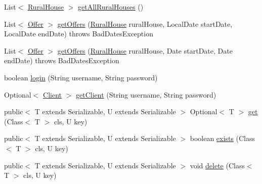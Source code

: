 \begin{DoxyCompactItemize}
List$<$ \mbox{\hyperlink{classcom_1_1ruralhousejsf_1_1domain_1_1_rural_house}{Rural\+House}} $>$ \mbox{\hyperlink{interfacecom_1_1ruralhousejsf_1_1business_logic_1_1_application_facade_interface_aba85657d1479d51b7bf1bd17d66d0513}{get\+All\+Rural\+Houses}} ()
\item 
List$<$ \mbox{\hyperlink{classcom_1_1ruralhousejsf_1_1domain_1_1_offer}{Offer}} $>$ \mbox{\hyperlink{interfacecom_1_1ruralhousejsf_1_1business_logic_1_1_application_facade_interface_a31b31b351fd53d7eabe3346b043dc744}{get\+Offers}} (\mbox{\hyperlink{classcom_1_1ruralhousejsf_1_1domain_1_1_rural_house}{Rural\+House}} rural\+House, Local\+Date start\+Date, Local\+Date end\+Date)  throws Bad\+Dates\+Exception
\item 
List$<$ \mbox{\hyperlink{classcom_1_1ruralhousejsf_1_1domain_1_1_offer}{Offer}} $>$ \mbox{\hyperlink{interfacecom_1_1ruralhousejsf_1_1business_logic_1_1_application_facade_interface_a1ce3b82ceb8bda252ff3a54bab3e1c69}{get\+Offers}} (\mbox{\hyperlink{classcom_1_1ruralhousejsf_1_1domain_1_1_rural_house}{Rural\+House}} rural\+House, Date start\+Date, Date end\+Date)  throws Bad\+Dates\+Exception
\item 
boolean \mbox{\hyperlink{interfacecom_1_1ruralhousejsf_1_1business_logic_1_1_application_facade_interface_a75cc2d20f7df7b8872333cca281bf343}{login}} (String username, String password)
\item 
Optional$<$ \mbox{\hyperlink{classcom_1_1ruralhousejsf_1_1domain_1_1_client}{Client}} $>$ \mbox{\hyperlink{interfacecom_1_1ruralhousejsf_1_1business_logic_1_1_application_facade_interface_af9901ddc9cbe77aaa08085c3c19167c6}{get\+Client}} (String username, String password)
\item 
public$<$ T extends Serializable, U extends Serializable $>$ Optional$<$ T $>$ \mbox{\hyperlink{interfacecom_1_1ruralhousejsf_1_1business_logic_1_1_application_facade_interface_ab34954db52378fc9370d4da9a09100c4}{get}} (Class$<$ T $>$ cls, U key)
\item 
public$<$ T extends Serializable, U extends Serializable $>$ boolean \mbox{\hyperlink{interfacecom_1_1ruralhousejsf_1_1business_logic_1_1_application_facade_interface_a044c60e4bee5202364454401446b3376}{exists}} (Class$<$ T $>$ cls, U key)
\item 
public$<$ T extends Serializable, U extends Serializable $>$ void \mbox{\hyperlink{interfacecom_1_1ruralhousejsf_1_1business_logic_1_1_application_facade_interface_ae1d7f5b5d748492f7fab3d621347ffeb}{delete}} (Class$<$ T $>$ cls, U key)
\end{DoxyCompactItemize}


